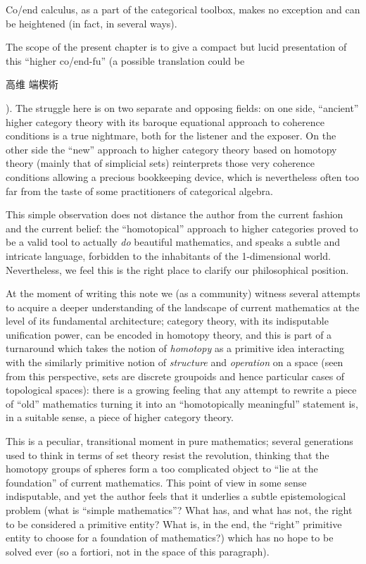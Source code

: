 Co/end calculus, as a part of the categorical toolbox, makes no exception and can be heightened (in fact, in several ways). 

The scope of the present chapter is to give a compact but lucid presentation of this ``higher co/end-fu'' (a possible translation could be \begin{CJK*}{UTF8}{bsmi}高维 端楔術\end{CJK*}). The struggle here is on two separate and opposing fields: on one side, ``ancient'' higher category theory \cite{coherence-tricat,hoffnung2011spans} with its baroque equational approach to coherence conditions is a true nightmare, both for the listener and the exposer. On the other side the ``new'' approach to higher category theory based on homotopy theory (mainly that of simplicial sets) reinterprets those very coherence conditions allowing a precious bookkeeping device, which is nevertheless often too far from the taste of some practitioners of categorical algebra.

This simple observation does not distance the author from the current fashion and the current belief: the ``homotopical'' approach to higher categories proved to be a valid tool to actually \emph{do} beautiful mathematics, and speaks a subtle and intricate language, forbidden to the inhabitants of the 1-dimensional world. Nevertheless, we feel this is the right place to clarify our philosophical position.

At the moment of writing this note we (as a community) witness several attempts to acquire a deeper understanding of the landscape of current mathematics at the level of its fundamental architecture; category theory, with its indisputable unification power, can be encoded in homotopy theory, and this is part of a turnaround which takes the notion of \emph{homotopy} as a primitive idea interacting with the similarly primitive notion of \emph{structure} and \emph{operation} on a space (seen from this perspective, sets are discrete groupoids and hence particular cases of topological spaces): there is a growing feeling that any attempt to rewrite a piece of ``old'' mathematics turning it into an ``homotopically meaningful'' statement is, in a suitable sense, a piece of higher category theory.

This is a peculiar, transitional moment in pure mathematics; several generations used to think in terms of set theory resist the revolution, thinking that the homotopy groups of spheres form a too complicated object to ``lie at the foundation'' of current mathematics. This point of view in some sense indisputable, and yet the author feels that it underlies a subtle epistemological problem (what is ``simple mathematics''? What has, and what has not, the right to be considered a primitive entity? What is, in the end, the ``right'' primitive entity to choose for a foundation of mathematics?) which has no hope to be solved ever (so a fortiori, not in the space of this paragraph).

